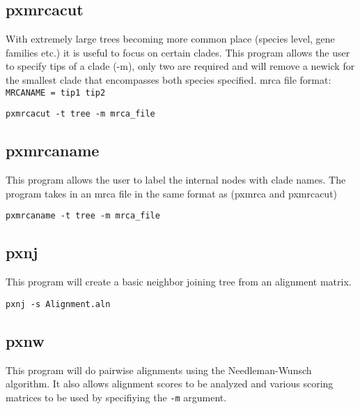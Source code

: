 \documentclass[12pt,letterpaper]{memoir}
\begin{document}
\subsection{pxmrcacut}

With extremely large trees becoming more common place (species level, gene families etc.) it is useful to focus on certain clades. This program allows the user to specify tips of a clade (-m), only two are required and will remove a newick for the smallest clade that encompasses both species specified. mrca file format:
\texttt{MRCANAME = tip1 tip2}

\begin{flushleft}
\begin{verbatim}
pxmrcacut -t tree -m mrca_file
\end{verbatim}
\end{flushleft}

\subsection{pxmrcaname}

This program allows the user to label the internal nodes with clade names. The program takes in an mrca file in the same format as (pxmrca and pxmrcacut)

\begin{flushleft}
\begin{verbatim}
pxmrcaname -t tree -m mrca_file
\end{verbatim}
\end{flushleft}

\subsection{pxnj}

This program will create a basic neighbor joining tree from an alignment matrix.

\begin{flushleft}
\begin{verbatim}
pxnj -s Alignment.aln
\end{verbatim}
\end{flushleft}

\subsection{pxnw}

This program will do pairwise alignments using the Needleman-Wunsch algorithm. It also allows alignment scores to be analyzed and various scoring matrices to be used by specifiying the \texttt{-m} argument.
\end{document}
